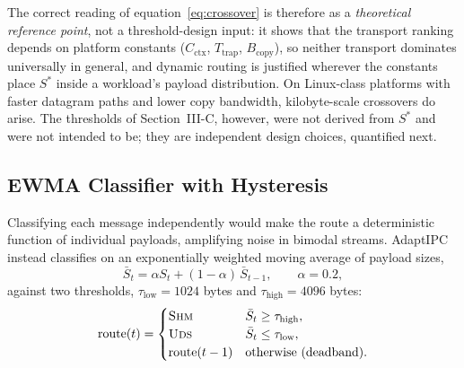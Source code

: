 \documentclass[conference]{IEEEtran}
\newcommand{\taulow}{\tau_{\mathrm{low}}}
\newcommand{\tauhigh}{\tau_{\mathrm{high}}}
\newcommand{\sbar}{\bar{S}}
\begin{document}
The correct reading of equation~\eqref{eq:crossover} is therefore as a
\emph{theoretical reference point}, not a threshold-design input: it shows
that the transport ranking depends on platform constants
($C_{\mathrm{ctx}}$, $T_{\mathrm{trap}}$, $B_{\mathrm{copy}}$), so neither
transport dominates universally in general, and dynamic routing is
justified wherever the constants place $S^{*}$ inside a workload's payload
distribution. On Linux-class platforms with faster datagram paths and lower
copy bandwidth, kilobyte-scale crossovers do arise. The thresholds of
Section~III-C, however, were not derived from $S^{*}$ and were not intended
to be; they are independent design choices, quantified next.

\subsection{EWMA Classifier with Hysteresis}
Classifying each message independently would make the route a deterministic
function of individual payloads, amplifying noise in bimodal streams.
AdaptIPC instead classifies on an exponentially weighted moving average of
payload sizes,
\begin{equation}
\sbar_t = \alpha S_t + (1-\alpha)\,\sbar_{t-1},
\qquad \alpha = 0.2,
\label{eq:ewma}
\end{equation}
against two thresholds, $\taulow = 1024$ bytes and $\tauhigh = 4096$ bytes:
\begin{equation}
\mathrm{route}(t)=
\begin{cases}
\textsc{Shm} & \sbar_t \geq \tauhigh,\\
\textsc{Uds} & \sbar_t \leq \taulow,\\
\mathrm{route}(t-1) & \text{otherwise (deadband).}
\end{cases}
\label{eq:hysteresis}
\end{equation}
\end{document}
